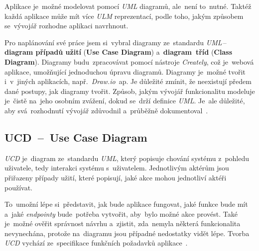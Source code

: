 \documentclass[11pt,a4paper]{report}
\begin{document}
            Aplikace je~možné modelovat pomocí \emph{UML} diagramů, ale~není to~nutné. Taktéž každá aplikace může mít více \emph{ULM} reprezentací, podle toho, jakým způsobem se~vývojář rozhodne aplikaci navrhnout.

            Pro naplánování své práce jsem si~vybral diagramy ze~standardu \emph{UML}\,--\,\textbf{diagram případů užití} (\textbf{Use Case Diagram}) a~\textbf{diagram~tříd} (\textbf{Class Diagram}). Diagramy budu~zpracovávat pomocí nástroje \emph{Creately}, což je~webová aplikace, umožňující jednoduchou úpravu diagramů. Diagramy je~možné tvořit i~v~jiných aplikacích, např.~\emph{Draw.io}~ap. Je důležité zmínit, že neexistují předem dané postupy, jak diagramy tvořit. Způsob, jakým vývojář funkcionalitu modeluje je~čistě na~jeho osobním zvážení, dokud se~drží definice \emph{UML}. Je~ale důležité, aby svá~rozhodnutí vývojář zdůvodnil a~průběžně dokumentoval~\cite{uml:FowlerBook, uml:diagram}.

            \subsection{UCD~--~Use Case Diagram}
                \emph{UCD} je~diagram ze~standardu \emph{UML}, který popisuje chování systému z~pohledu uživatele, tedy interakci systému s~uživatelem. Jednotlivým aktérům jsou přiřazeny případy užití, které popisují, jaké akce mohou jednotliví aktéři používat.

                To~umožní lépe si~představit, jak bude aplikace fungovat, jaké funkce bude mít a~jaké \emph{endpointy} bude~potřeba vytvořit, aby~bylo možné akce provést. Také je~možné ověřit správnost návrhu a~zjistit, zda~nemyla některá funkcionalita nevynechána, protože na~diagramu jsou případné nedostatky vidět lépe. Tvorba \emph{UCD} vychází ze~specifikace funkčních požadavků aplikace~\cite{uml:usecase}.
\end{document}
